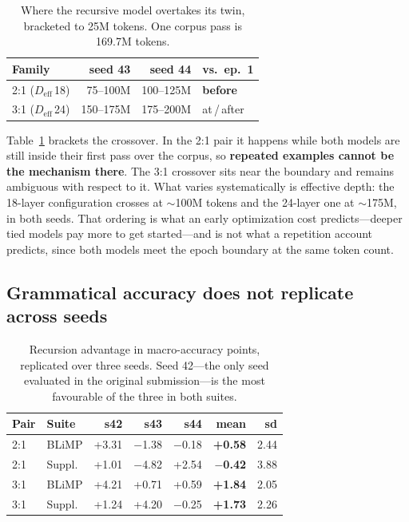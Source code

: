 \documentclass[11pt]{article}
\begin{document}
\begin{table}[t]
\centering
\small
\begin{tabular}{lrrl}
\toprule
Family & seed 43 & seed 44 & vs.\ ep.\ 1 \\
\midrule
2:1 ($D_{\text{eff}}$\,18) & 75--100M & 100--125M & \textbf{before} \\
3:1 ($D_{\text{eff}}$\,24) & 150--175M & 175--200M & at\,/\,after \\
\bottomrule
\end{tabular}
\caption{Where the recursive model overtakes its twin, bracketed to 25M tokens. One corpus pass is 169.7M tokens.}
\label{tab:crossover}
\end{table}

Table~\ref{tab:crossover} brackets the crossover. In the 2:1 pair it happens while both models are still inside their first pass over the corpus, so \textbf{repeated examples cannot be the mechanism there}. The 3:1 crossover sits near the boundary and remains ambiguous with respect to it. What varies systematically is effective depth: the 18-layer configuration crosses at ${\sim}$100M tokens and the 24-layer one at ${\sim}$175M, in both seeds. That ordering is what an early optimization cost predicts---deeper tied models pay more to get started---and is not what a repetition account predicts, since both models meet the epoch boundary at the same token count.

\subsection{Grammatical accuracy does not replicate across seeds}
\label{sec:blimpseeds}

\begin{table}[t]
\centering
\footnotesize
\setlength{\tabcolsep}{3pt}
\begin{tabular}{llrrrrr}
\toprule
Pair & Suite & s42 & s43 & s44 & mean & sd \\
\midrule
2:1 & BLiMP & +3.31 & $-$1.38 & $-$0.18 & \textbf{+0.58} & 2.44 \\
2:1 & Suppl. & +1.01 & $-$4.82 & +2.54 & \textbf{$-$0.42} & 3.88 \\
3:1 & BLiMP & +4.21 & +0.71 & +0.59 & \textbf{+1.84} & 2.05 \\
3:1 & Suppl. & +1.24 & +4.20 & $-$0.25 & \textbf{+1.73} & 2.26 \\
\bottomrule
\end{tabular}
\caption{Recursion advantage in macro-accuracy points, replicated over three seeds. Seed 42---the only seed evaluated in the original submission---is the most favourable of the three in both suites.}
\label{tab:blimpseeds}
\end{table}
\end{document}
